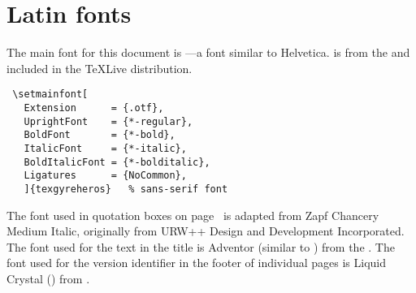 \section{Latin fonts}
\label{sec:type_latin}
The main font for this document is ---a  font similar to Helvetica.
 is from the  and included in the {\TeX}Live distribution.
\begin{lstlisting}
 \setmainfont[
   Extension      = {.otf},
   UprightFont    = {*-regular},
   BoldFont       = {*-bold},
   ItalicFont     = {*-italic},
   BoldItalicFont = {*-bolditalic},
   Ligatures      = {NoCommon},
   ]{texgyreheros}   % sans-serif font
\end{lstlisting}
The font used in quotation boxes on page~\pageref{quotepair} is adapted from {\fntZapf Zapf Chancery Medium Italic},
originally from URW++ Design and Development Incorporated.
The font used for the text in the title is {\fntAdventor Adventor} (similar to ) from the .
The font used for the version identifier in the footer of individual pages is 
\mbox{\fntDigital\footnotesize Liquid} \mbox{\fntDigital\footnotesize Crystal} 
() from .

